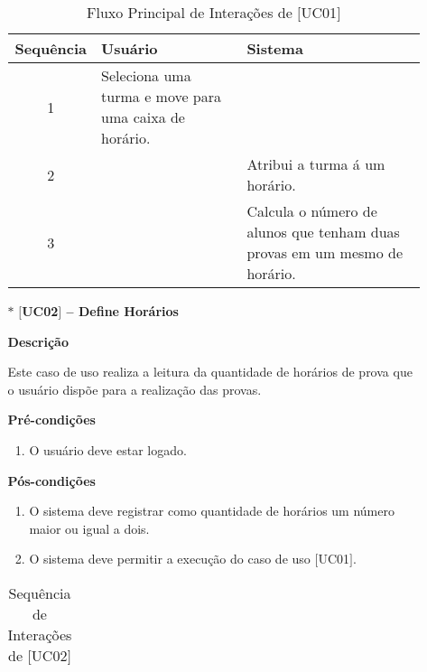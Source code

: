 \begin{itemize}
\begin{itemize}
        
        \begin{table}[H]
            \centering
            \caption{Fluxo Principal de Interações de $[$UC01$]$}
            \vspace{0.5cm}
            \renewcommand\arraystretch{1.5}
            \begin{tabular}{c|p{6cm}|p{6cm}}
             
                \textbf{Sequência} & \textbf{Usuário} & \textbf{Sistema} \\ %
                \hline                               %
                1 & Seleciona uma turma e move para uma caixa de horário.  &  \\
                2 &   & Atribui a turma á um horário. \\
                3 & & Calcula o número de alunos que tenham duas provas em um mesmo de horário.          %
                \\
                \hline
            \end{tabular}
        \end{table}
        
       
        
        \item[$\ast$] \textbf{$[$UC02$]$ -- Define Horários}
        
        \textbf{Descrição}
        
        Este caso de uso realiza a leitura da quantidade de horários de prova que o usuário dispõe para a realização das provas.
        
        \textbf{Pré-condições}
        \begin{enumerate}
            \item  O usuário deve estar logado. 
        \end{enumerate}
        
        \textbf{Pós-condições}
        \begin{enumerate}
            \item O sistema deve registrar como quantidade de horários um número maior ou igual a dois. 
            \item O sistema deve permitir a execução do caso de uso $[$UC01$]$.
        \end{enumerate}
        
     \begin{table}[H]
            \centering
            \caption{Sequência de Interações de $[$UC02$]$}
            \vspace{0.5cm}
            \renewcommand\arraystretch{1.5}
            \begin{tabular}{c|p{6cm}|p{6cm}}
             

\end{tabular}
\end{table}
\end{itemize}
\end{itemize}
